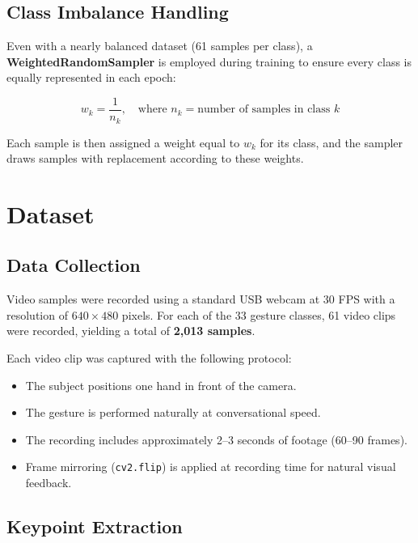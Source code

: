 \documentclass[12pt, a4paper]{article}
\begin{document}
\subsection{Class Imbalance Handling}

Even with a nearly balanced dataset (61 samples per class), a \textbf{WeightedRandomSampler} is employed during training to ensure every class is equally represented in each epoch:

\begin{equation}
    w_k = \frac{1}{n_k}, \quad \text{where } n_k = \text{number of samples in class } k
    \label{eq:class_weight}
\end{equation}

Each sample is then assigned a weight equal to $w_k$ for its class, and the sampler draws samples with replacement according to these weights.

\section{Dataset}
\label{sec:dataset}

\subsection{Data Collection}

Video samples were recorded using a standard USB webcam at 30 FPS with a resolution of $640 \times 480$ pixels. For each of the 33 gesture classes, 61 video clips were recorded, yielding a total of \textbf{2{,}013 samples}.

Each video clip was captured with the following protocol:
\begin{itemize}
    \item The subject positions one hand in front of the camera.
    \item The gesture is performed naturally at conversational speed.
    \item The recording includes approximately 2--3 seconds of footage (60--90 frames).
    \item Frame mirroring (\texttt{cv2.flip}) is applied at recording time for natural visual feedback.
\end{itemize}

\subsection{Keypoint Extraction}
\end{document}

